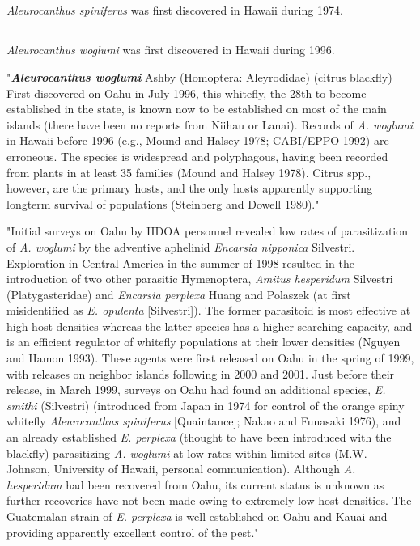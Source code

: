 \documentclass[]{scrartcl}
\begin{document}
\subsection{}

\textit{Aleurocanthus spiniferus} was first discovered in Hawaii during 1974.


\subsection{}

\textit{Aleurocanthus woglumi} was first discovered in Hawaii during 1996.

"\textit{\textbf{Aleurocanthus woglumi}} Ashby (Homoptera: Aleyrodidae) (citrus blackfly) First discovered on Oahu in July 1996, this whitefly, the 28th to become established in the state, is known now to be established on most of the main islands (there have been no reports from Niihau or Lanai). Records of \textit{A. woglumi} in Hawaii before 1996 (e.g., Mound and Halsey 1978; CABI/EPPO 1992) are erroneous. The species is widespread and polyphagous, having been recorded from plants in at least 35 families (Mound and Halsey 1978). Citrus spp., however, are the primary hosts, and the only hosts apparently supporting longterm survival of populations (Steinberg and Dowell 1980)."

"Initial surveys on Oahu by HDOA personnel revealed low rates of parasitization of \textit{A. woglumi} by the adventive aphelinid \textit{Encarsia nipponica} Silvestri. Exploration in Central America in the summer of 1998 resulted in the introduction of two other parasitic Hymenoptera, \textit{Amitus hesperidum} Silvestri (Platygasteridae) and \textit{Encarsia perplexa} Huang and Polaszek (at first misidentified as \textit{E. opulenta} [Silvestri]). The former parasitoid is most effective at high host densities whereas the latter species has a higher searching capacity, and is an efficient regulator of whitefly populations at their lower densities (Nguyen and Hamon 1993). These agents were first released on Oahu in the spring of 1999, with releases on neighbor islands following in 2000 and 2001. Just before their release, in March 1999, surveys on Oahu had found an additional species, \textit{E. smithi} (Silvestri) (introduced from Japan in 1974 for control of the orange spiny whitefly \textit{Aleurocanthus spiniferus} [Quaintance]; Nakao and Funasaki 1976), and an already established \textit{E. perplexa} (thought to have been introduced with the blackfly) parasitizing \textit{A. woglumi} at low rates within limited sites (M.W. Johnson, University of Hawaii, personal communication). Although \textit{A. hesperidum} had been recovered from Oahu, its current status is unknown as further recoveries have not been made owing to extremely low host densities. The Guatemalan strain of \textit{E. perplexa} is well established on Oahu and Kauai and providing apparently excellent control of the pest."
\end{document}
